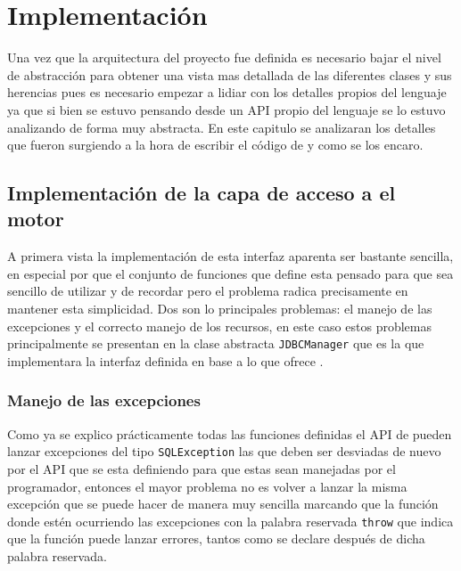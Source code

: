 \chapter{Implementación}
Una vez que la arquitectura del proyecto fue definida es necesario bajar el nivel de abstracción para obtener una vista mas detallada de las diferentes clases y sus herencias pues es necesario empezar a lidiar con los detalles propios del lenguaje ya que si bien se estuvo pensando desde un API propio del lenguaje se lo estuvo analizando de forma muy abstracta. En este capitulo se analizaran los detalles que fueron surgiendo a la hora de escribir el código de \jj y como se los encaro.
%
%
%
\section{Implementación de la capa de acceso a el motor}
A primera vista la implementación de esta interfaz aparenta ser bastante sencilla, en especial por que el conjunto de funciones que define esta pensado para que sea sencillo de utilizar y de recordar pero el problema radica precisamente en mantener esta simplicidad. Dos son lo principales problemas: el manejo de las excepciones y el correcto manejo de los recursos, en este caso estos problemas principalmente se presentan en la clase abstracta \verb=JDBCManager= que es la que implementara la interfaz definida en base a lo que ofrece \jd.
%
\subsection{Manejo de las excepciones}
Como ya se explico prácticamente todas las funciones definidas el API de \jd pueden lanzar excepciones del tipo \verb=SQLException= las que deben ser desviadas de nuevo por el API que se esta definiendo para que estas sean manejadas por el programador, entonces el mayor problema   no es volver a lanzar la misma excepción que se puede hacer de manera muy sencilla marcando que la función donde estén ocurriendo las excepciones con la palabra reservada \verb=throw= que indica que la función puede lanzar errores, tantos como se declare después de dicha palabra reservada.

